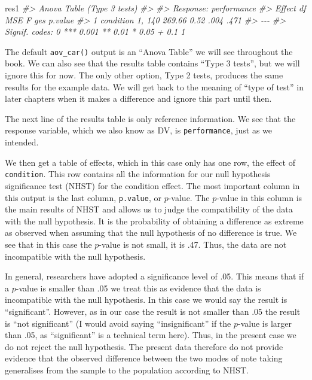 \documentclass[
]{book}
\newenvironment{Shaded}{\begin{snugshade}}{\end{snugshade}}
\newcommand{\CommentTok}[1]{\textcolor[rgb]{0.56,0.35,0.01}{\textit{#1}}}
\newcommand{\NormalTok}[1]{#1}
\begin{document}
\begin{Shaded}
\begin{Highlighting}[]
\NormalTok{res1}
\CommentTok{\#\textgreater{} Anova Table (Type 3 tests)}
\CommentTok{\#\textgreater{} }
\CommentTok{\#\textgreater{} Response: performance}
\CommentTok{\#\textgreater{}      Effect     df    MSE    F  ges p.value}
\CommentTok{\#\textgreater{} 1 condition 1, 140 269.66 0.52 .004    .471}
\CommentTok{\#\textgreater{} {-}{-}{-}}
\CommentTok{\#\textgreater{} Signif. codes:  0 \textquotesingle{}***\textquotesingle{} 0.001 \textquotesingle{}**\textquotesingle{} 0.01 \textquotesingle{}*\textquotesingle{} 0.05 \textquotesingle{}+\textquotesingle{} 0.1 \textquotesingle{} \textquotesingle{} 1}
\end{Highlighting}
\end{Shaded}

The default \texttt{aov\_car()} output is an ``Anova Table'' we will see throughout the book. We can also see that the results table contains ``Type 3 tests'', but we will ignore this for now. The only other option, Type 2 tests, produces the same results for the example data. We will get back to the meaning of ``type of test'' in later chapters when it makes a difference and ignore this part until then.

The next line of the results table is only reference information. We see that the response variable, which we also know as DV, is \texttt{performance}, just as we intended.

We then get a table of effects, which in this case only has one row, the effect of \texttt{condition}. This row contains all the information for our null hypothesis significance test (NHST) for the condition effect. The most important column in this output is the last column, \texttt{p.value}, or \(p\)-value. The \(p\)-value in this column is the main results of NHST and allows us to judge the compatibility of the data with the null hypothesis. It is the probability of obtaining a difference as extreme as observed when assuming that the null hypothesis of no difference is true. We see that in this case the \(p\)-value is not small, it is .47. Thus, the data are not incompatible with the null hypothesis.

In general, researchers have adopted a significance level of .05. This means that if a \(p\)-value is smaller than .05 we treat this as evidence that the data is incompatible with the null hypothesis. In this case we would say the result is ``significant''. However, as in our case the result is not smaller than .05 the result is ``not significant'' (I would avoid saying ``insignificant'' if the \(p\)-value is larger than .05, as ``significant'' is a technical term here). Thus, in the present case we do not reject the null hypothesis. The present data therefore do not provide evidence that the observed difference between the two modes of note taking generalises from the sample to the population according to NHST.
\end{document}
